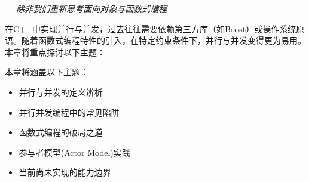 \begin{flushright}
\textit{--- 除非我们重新思考面向对象与函数式编程}
\end{flushright}

在C++中实现并行与并发，过去往往需要依赖第三方库（如Boost）或操作系统原语。随着函数式编程特性的引入，在特定约束条件下，并行与并发变得更为易用。本章将重点探讨以下主题：

本章将涵盖以下主题：

\begin{itemize}
\item 
并行与并发的定义辨析

\item 
并行并发编程中的常见陷阱

\item 
函数式编程的破局之道

\item 
参与者模型(Actor Model)实践

\item 
当前尚未实现的能力边界
\end{itemize}













